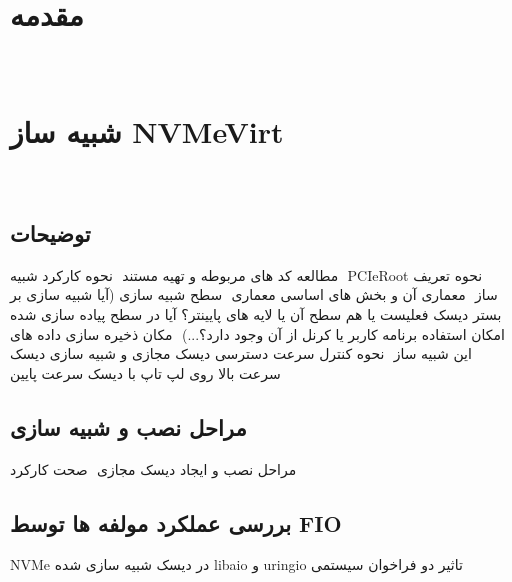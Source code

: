 ‫
‫%
‫%
‫%
‫
‫\usepackage{xepersian}
‫ %
‫ %
‫
‫
‫\section{مقدمه}
‫
‫
‫
‫‫\section{شبیه ساز NVMeVirt }
‫‫\subsection*{توضیحات}
‫
‫نحوه تعریف PCIeRoot
‫
‫مطالعه کد های مربوطه و تهیه مستند
‫
‫نحوه کارکرد شبیه ساز
‫
‫معماری آن و بخش های اساسی معماری
‫
‫سطح شبیه سازی (آیا شبیه سازی بر بستر دیسک فعلیست یا هم سطح آن یا لایه های پایینتر؟ آیا در سطح پیاده سازی شده امکان استفاده برنامه کاربر یا کرنل از آن وجود دارد؟...)
‫
‫مکان ذخیره سازی داده های این شبیه ساز
‫
‫نحوه کنترل سرعت دسترسی دیسک مجازی و شبیه سازی دیسک سرعت بالا روی لپ تاپ با دیسک سرعت پایین
‫
‫‫\subsection*{مراحل نصب و شبیه سازی}
‫مراحل نصب و ایجاد دیسک مجازی
‫
‫صحت کارکرد
‫
‫‫\subsection*{بررسی عملکرد مولفه ها توسط FIO}
‫
‫
‫تاثیر دو فراخوان سیستمی uringio و libaio در دیسک شبیە سازی شده NVMe
